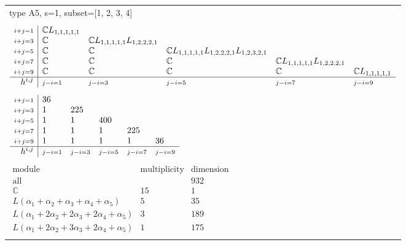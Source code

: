 \documentclass[crop,border=2mm]{standalone}
\begin{document}
\begin{tabular}{l}
{\huge type A5, s=1, subset=[1, 2, 3, 4]}\\ \\


$\displaystyle
\begin{array}{r|l l l l l}
	{\scriptstyle i+j=1}&\mathbb{C}L_{1,1,1,1,1}&&&&\\
	{\scriptstyle i+j=3}&\mathbb{C}&\mathbb{C}L_{1,1,1,1,1}L_{1,2,2,2,1}&&&\\
	{\scriptstyle i+j=5}&\mathbb{C}&\mathbb{C}&\mathbb{C}L_{1,1,1,1,1}L_{1,2,2,2,1}L_{1,2,3,2,1}&&\\
	{\scriptstyle i+j=7}&\mathbb{C}&\mathbb{C}&\mathbb{C}&\mathbb{C}L_{1,1,1,1,1}L_{1,2,2,2,1}&\\
	{\scriptstyle i+j=9}&\mathbb{C}&\mathbb{C}&\mathbb{C}&\mathbb{C}&\mathbb{C}L_{1,1,1,1,1}\\
	\hline h^{i,j}&{\scriptstyle j-i=1}&{\scriptstyle j-i=3}&{\scriptstyle j-i=5}&{\scriptstyle j-i=7}&{\scriptstyle j-i=9}
\end{array}
$ \\ \\


$\displaystyle
\begin{array}{r|l l l l l}
	{\scriptstyle i+j=1}&36&&&&\\
	{\scriptstyle i+j=3}&1&225&&&\\
	{\scriptstyle i+j=5}&1&1&400&&\\
	{\scriptstyle i+j=7}&1&1&1&225&\\
	{\scriptstyle i+j=9}&1&1&1&1&36\\
	\hline h^{i,j}&{\scriptstyle j-i=1}&{\scriptstyle j-i=3}&{\scriptstyle j-i=5}&{\scriptstyle j-i=7}&{\scriptstyle j-i=9}
\end{array}
$ \\ \\


$\displaystyle
\begin{array}{rll}
	\text{module}&\text{multiplicity}&\text{dimension} \\ \hline \text{all}&&932 \\
	\mathbb{C}&15&1\\
	L\left(\alpha_{1}+\alpha_{2}+\alpha_{3}+\alpha_{4}+\alpha_{5}\right)&5&35\\
	L\left(\alpha_{1}+ 2\alpha_{2}+ 2\alpha_{3}+ 2\alpha_{4}+\alpha_{5}\right)&3&189\\
	L\left(\alpha_{1}+ 2\alpha_{2}+ 3\alpha_{3}+ 2\alpha_{4}+\alpha_{5}\right)&1&175
\end{array}
$ \\ \\

\end{tabular}
\end{document}
